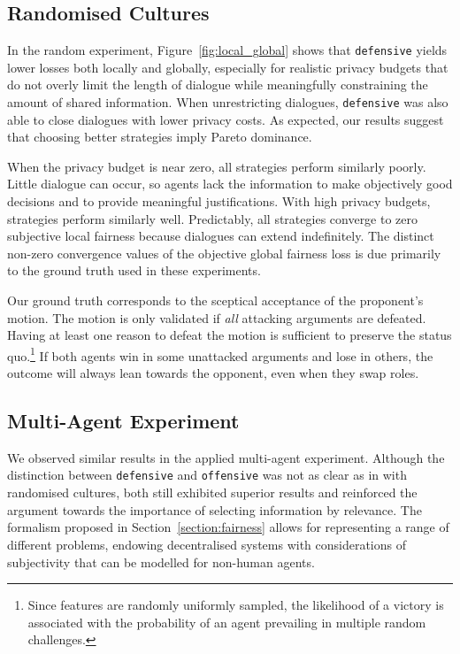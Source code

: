 \documentclass[acmsmall]{custom-arxiv}  %
\begin{document}
\subsection{Randomised Cultures}




In the random experiment, Figure~\ref{fig:local_global} shows that \texttt{defensive} yields lower losses both locally and globally, especially for realistic privacy budgets that do not overly limit the length of dialogue while meaningfully constraining the amount of shared information. When unrestricting dialogues, \texttt{defensive} was also able to close dialogues with lower privacy costs. As expected, our results suggest that choosing better strategies imply Pareto dominance. 

When the privacy budget is near zero, all strategies perform similarly poorly. Little dialogue can occur, so agents lack the information to make objectively good decisions and to provide meaningful justifications. With high privacy budgets, strategies perform similarly well. Predictably, all strategies converge to zero subjective local fairness because dialogues can extend indefinitely. The distinct non-zero convergence values of the objective global fairness loss is due primarily to the ground truth used in these experiments.

Our ground truth corresponds to the sceptical acceptance of the proponent's motion. The motion is only validated if \textit{all} attacking arguments are defeated. Having at least one reason to defeat the motion is sufficient to preserve the status quo.\footnote{Since features are randomly uniformly sampled, the likelihood of a victory is associated with the probability of an agent prevailing in multiple random challenges.}  If both agents win in some unattacked arguments and lose in others, the outcome will always lean towards the opponent, even when they swap roles.

\subsection{Multi-Agent Experiment}

We observed similar results in the applied multi-agent experiment. Although the distinction between \texttt{defensive} and \texttt{offensive} was not as clear as in with randomised cultures, both still exhibited superior results and reinforced the argument towards the importance of selecting information by relevance. The formalism proposed in Section~\ref{section:fairness} allows for representing a range of different problems, endowing decentralised systems with considerations of subjectivity that can be modelled for non-human agents. 
\end{document}
